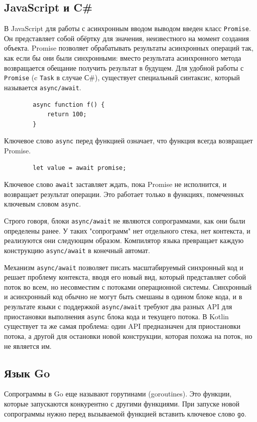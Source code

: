 	\subsection{JavaScript и C\#}
	В JavaScript для работы с асинхронным вводом выводом введен класс \texttt{Promise}.
	Он представляет собой обёртку для значения, неизвестного на момент создания объекта. 
	Promise позволяет обрабатывать результаты асинхронных операций так, как если бы они были синхронными:
	вместо результата асинхронного метода возвращается обещание получить результат в будущем.
	Для удобной работы с \texttt{Promise} (c \texttt{Task} в случае С\#)\cite{c-sharp}, существует специальный синтаксис, 
	который называется \texttt{async/await}. 
	
	\begin{lstlisting}
		async function f() {
			return 100;
		}
	\end{lstlisting}

	Ключевое слово \texttt{async} перед функцией означает, что функция всегда возвращает Promise.
	
	\begin{lstlisting}
		let value = await promise;
	\end{lstlisting}
	Ключевое слово \texttt{await} заставляет ждать, пока Promise не исполнится, и 
	возвращает результат операции. Это работает только в функциях, помеченных ключевым словом \texttt{async}. 
	\par
	Строго говоря, блоки \texttt{async/await} не являются сопрограммами, как они были определены ранее. 
	У таких "сопрограмм" нет отдельного стека, нет контекста, и реализуются они следующим образом. 
	Компилятор языка превращает каждую конструкцию \texttt{async/await} в конечный автомат.

	Механизм \texttt{async/await} позволяет писать масштабируемый синхронный код и решает проблему контекста, вводя
	его	новый вид, который представляет собой поток во всем, но несовместим с потоками операционной
	системы. Синхронный и асинхронный код обычно не могут быть смешаны в одином блоке кода, и в
	результате языки с поддержкой \texttt{async/await} требуют два разных API для приостановки выполнения \texttt{async}
	блока кода и текущего потока. В Kotlin существует та же самая проблема: один API предназначен для
	приостановки потока, а другой для остановки новой конструкции, которая похожа на поток, но не является
	им\cite{kotlin-lang}.
	\clearpage
	
	\subsection{Язык Go}
	Сопрограммы в Go еще называют горутинами (goroutines). Это функции, которые запускаются конкурентно с 
	другими функциями\cite{go}. 
	При запуске новой сопрограммы нужно перед вызываемой функцией вставить ключевое слово \texttt{go}.
	
